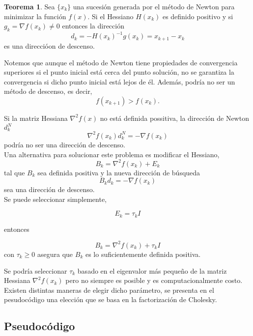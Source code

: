 \documentclass[11pt,letterpaper]{article}
\theoremstyle{definition}
\theoremstyle{definition}
\newtheorem{teo}{Teorema}[section]%
\theoremstyle{definition}
\begin{document}
\begin{shaded*}
	\begin{teo}
	 Sea $ \{ x_k \} $ una sucesión generada por el método de Newton para minimizar la función $ f(x) $. Si el Hessiano $ H(x_k) $ es definido positivo y si $ g_k = \nabla f(x_k) \neq 0 $ entonces la dirección
	 \[ d_k = - H(x_k)^{-1} g(x_k) = x_{k+1} - x_k \]
	 es una direccióon de descenso.
	\end{teo} 
\end{shaded*}

Notemos que aunque el método de Newton tiene propiedades de convergencia superiores si el punto inicial está cerca del punto solución, no se garantiza la convergencia si dicho punto inicial está lejos de él. Además, podría no ser un método de descenso, es decir, 
\[ f(x_{k+1}) > f(x_k). \]

Si la matriz Hessiana $ \nabla^2 f(x) $ no está definida possitiva, la dirección de Newton $ d_k^N $
\[ \nabla^2 f(x_k) d_k^N = - \nabla f (x_k) \]
podría no ser una dirección de descenso. 
\\
Una alternativa para solucionar este problema es modificar el Hessiano,
\[ B_k = \nabla^2 f(x_k) + E_k \]
tal que $ B_k $ sea definida positiva y la nueva dirección de búsqueda
\[ B_k d_k = - \nabla f(x_k) \]
sea una dirección de descenso.
\\
Se puede seleccionar simplemente, 
\begin{shaded*}
	\begin{equation}
		E_k = \tau_k I
	\end{equation}
\end{shaded*}
entonces
\begin{shaded*}
	\begin{equation}
		B_k = \nabla^2 f(x_k) + \tau_k I
	\end{equation}
	con $ \tau_k \geq 0 $ asegura que $ B_k $ es lo suficientemente definida positiva.
\end{shaded*}
Se podría seleccionar $ \tau_k $ basado en el eigenvalor más pequeño de la matriz Hessiana $ \nabla^2 f(x_k) $ pero no siempre es posible y es computacionalmente costo.
\\
Existen distintas maneras de elegir dicho parámetro, se presenta en el pesudocódigo una elección que se basa en la factorización de Cholesky.


\subsection{Pseudocódigo}
\end{document}
